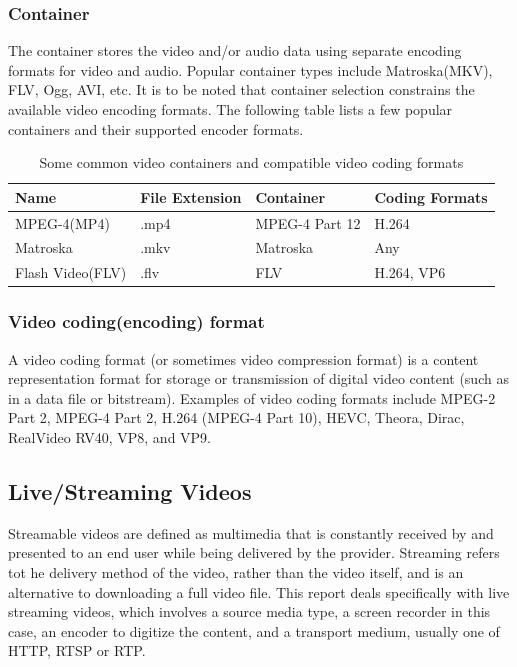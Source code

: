 \documentclass[letterpaper,12pt,titlepage,oneside,final]{report}
\begin{document}
            \subsubsection{Container}
                The container stores the video and/or audio data using separate encoding formats for video and audio. Popular container types include Matroska(MKV), FLV, Ogg, AVI, etc. It is to be noted that container selection constrains the available video encoding formats. The following table lists a few popular containers and their supported encoder formats.

                \begin{table}[!h]
                    \centering
                    \begin{tabular}{@{}|l|l|l|l|@{}}
                    \toprule
                    \rowcolor[HTML]{9B9B9B} 
                    Name             & File Extension & Container & Coding Formats                                                               \\ \midrule
                    MPEG-4(MP4)      & .mp4          & MPEG-4 Part 12  & H.264                                                                         \\ \midrule
                    Matroska         & .mkv           & Matroska  & Any                                                                                \\ \midrule
                    Flash Video(FLV) & .flv           & FLV       & H.264, VP6 \\ \bottomrule
                    \end{tabular}
                    \caption{Some common video containers and compatible video coding formats}
                    \label{my-label}
                \end{table}

            \subsubsection{Video coding(encoding) format}
                A video coding format (or sometimes video compression format) is a content representation format for storage or transmission of digital video content (such as in a data file or bitstream). Examples of video coding formats include MPEG-2 Part 2, MPEG-4 Part 2, H.264 (MPEG-4 Part 10), HEVC, Theora, Dirac, RealVideo RV40, VP8, and VP9.

        \subsection{Live/Streaming Videos}
            Streamable videos are defined as multimedia that is constantly received by and presented to an end user while being delivered by the provider. Streaming refers tot he delivery method of the video, rather than the video itself, and is an alternative to downloading a full video file. This report deals specifically with live streaming videos, which involves a source media type, a screen recorder in this case, an encoder to digitize the content, and a transport medium, usually one of HTTP, RTSP or RTP. 
\end{document}
